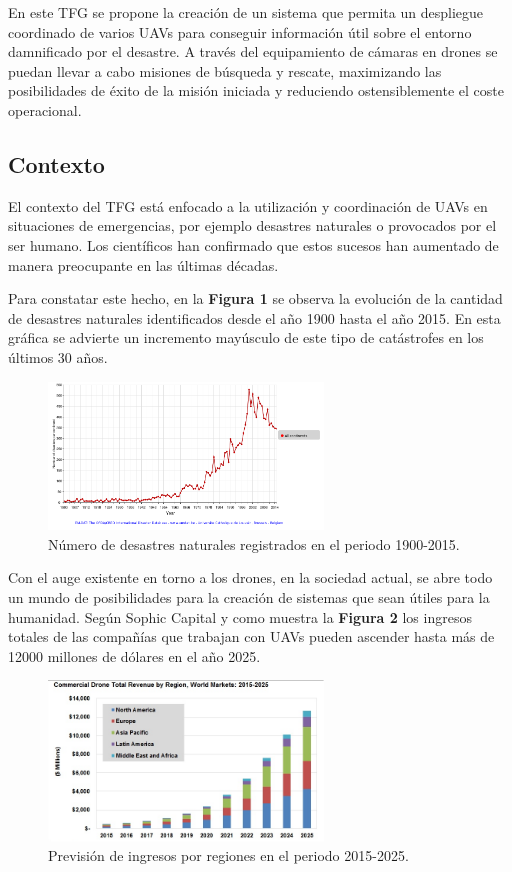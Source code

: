 \documentclass{pre-tfg}
\begin{document}
En este TFG se propone la creación de un sistema que permita un despliegue coordinado de varios UAVs para conseguir información útil sobre el entorno damnificado por el desastre. A través del equipamiento de cámaras en drones se puedan llevar a cabo misiones de búsqueda y rescate, maximizando las posibilidades de éxito de la misión iniciada y reduciendo ostensiblemente el coste operacional.

\subsection{Contexto}

El contexto del TFG está enfocado a la utilización y coordinación de UAVs en situaciones de emergencias, por ejemplo desastres naturales o provocados por el ser humano. Los científicos han confirmado que estos sucesos han aumentado de manera preocupante en las últimas décadas.

Para constatar este hecho, en la \textbf{Figura 1}\cite{EMDAT} se observa la evolución de la cantidad de desastres naturales identificados desde el año 1900 hasta el año 2015. En esta gráfica se advierte un incremento mayúsculo de este tipo de catástrofes en los últimos 30 años.

\begin{figure}[htb]
\centering
\includegraphics[width=0.65\textwidth]{./figures/catastrofesnaturales.png}
\caption{Número de desastres naturales registrados en el periodo 1900-2015.}
\end{figure}

Con el auge existente en torno a los drones, en la sociedad actual, se abre todo un mundo de posibilidades para la creación de sistemas que sean útiles para la humanidad. Según Sophic Capital y como muestra la \textbf{Figura 2}\cite{cuotamercado} los ingresos totales de las compañías que trabajan con UAVs pueden ascender hasta más de 12000 millones de dólares en el año 2025.


\begin{figure}[htb]
\centering
\includegraphics[width=0.65\textwidth]{./figures/DCA-15-chart.png}
\caption{Previsión de ingresos por regiones en el periodo 2015-2025.}
\end{figure} 
\end{document}
